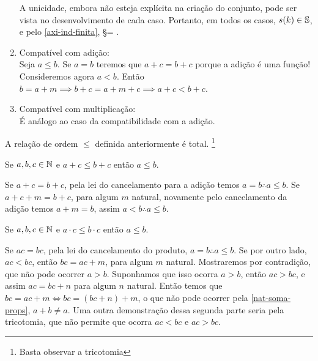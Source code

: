 \documentclass[../main.tex]{subfiles}
\begin{document}
\begin{dem}
\begin{enumerate}[label=(\roman*)]
        A unicidade, embora não esteja explícita na criação do conjunto, pode ser vista no desenvolvimento de cada caso.
        Portanto, em todos os casos, $s(k) \in \S$, e pelo \cref{axi-ind-finita}, \S = \N.
        
        \item Compatível com adição: \\
        Seja $a \leq b$. Se $a = b$ teremos que $a+c = b+c$ porque a adição é uma função! 
        Consideremos agora $a < b$. Então $b = a + m \implies b+c = a+m+c \implies a+c < b+c$.
        \item Compatível com multiplicação: \\
        É análogo ao caso da compatibilidade com a adição.
     \end{enumerate}
\end{dem}

\begin{corol}\label{nat-coro-tric}
    A relação de ordem $\leq$ definida anteriormente é total. \footnote{Basta observar a tricotomia}
\end{corol}

{ \textoIncluido
\begin{prop}
    Se $a,b,c \in \N$ e $a + c \leq b + c$ então $a \leq b$.
\end{prop}
\begin{dem}
    Se $a + c = b + c$, pela lei do cancelamento para a adição temos $a=b \therefore a \leq b$.
    Se $a + c + m = b + c$, para algum $m$ natural, novamente pelo cancelamento da adição temos $a+m = b$, assim $a < b \therefore a \leq b$.
\end{dem}
\begin{prop}
    Se $a,b,c \in \N$ e $a \cdot c \leq b \cdot c$ então $a \leq b$.
\end{prop}
\begin{dem}
    Se $ac = bc$, pela lei do cancelamento do produto, $a=b \therefore a \leq b$.
    Se por outro lado, $ac < bc$, então $bc = ac + m$, para algum $m$ natural. Mostraremos por contradição, que não pode ocorrer $a > b$.
    Suponhamos que isso ocorra $a > b$, então $ac > bc$, e assim $ac = bc + n$ para algum $n$ natural. Então temos que 
    $bc = ac + m \iff bc = (bc + n) + m$, o que não pode ocorrer pela \cref{nat-soma-props}, $a+b \neq a$. Uma outra demonstração dessa segunda parte seria pela tricotomia, que não permite que ocorra $ac < bc $ e $ac > bc$.
\end{dem}
}
\end{document}
